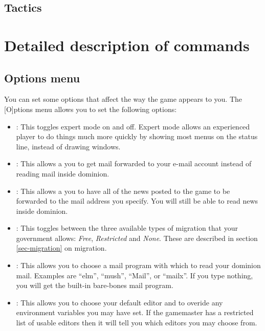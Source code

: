 \comment \section{Tactics}

\chapter{Detailed description of commands}

\section{Options menu}
You can set some options that affect the way the game appears to you.
The [O]ptions menu allows you to set the following options:
\begin{itemize}
\item
{}: This toggles expert mode on and off.  Expert mode
allows an experienced player to do things much more quickly by showing
most menus on the status line, instead of drawing windows.
\item
{}: This allows a you to get mail forwarded
to your e-mail account instead of reading mail inside dominion.
\item
{}: This allows a you to have all of the
news posted to the game to be forwarded to the mail address you specify.
You will still be able to read news inside dominion.
\item
{}: This toggles between the three available
types of migration that your government allows: {\em Free},
{\em Restricted} and {\em None}.  These are described in section
\ref{sec-migration} on migration.
\item
{}: This allows you to choose a mail program with
which to read your dominion mail.  Examples are ``elm'', ``mush'',
``Mail'', or ``mailx''.  If you type nothing, you will get the built-in
bare-bones mail program.
\item
{}: This allows you to choose your default editor
and to overide any environment variables you may have set.  If the
gamemaster has a restricted list of usable editors then it will tell
you which editors you may choose from.
\end{itemize}

